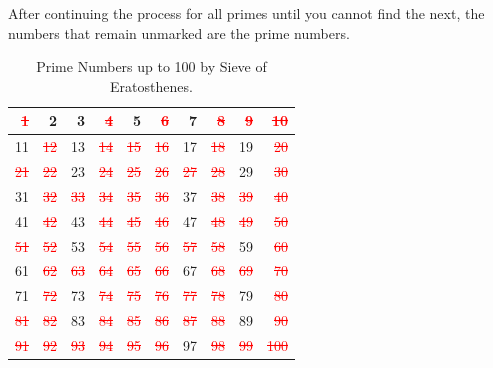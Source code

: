 \documentclass[12pt]{book}
\newcommand{\crossout}[1]{\textcolor{red}{\sout{#1}}}
\begin{document}
  After continuing the process for all primes until you cannot find the next, the numbers 
  that remain unmarked are the prime numbers.
  \begin{table}[h!]
    \centering
    \renewcommand{\arraystretch}{1.15}
    \label{tab:sieve_result}
  \begin{tabular}{|*{10}{r|}}
    \hline 
    \cellcolor{gray!25}\crossout{1} & 2 & 3 & \crossout{4} & 5 & \crossout{6} & 7 & \crossout{8} & \crossout{9} & \crossout{10} \\
    \hline 
    11 & \crossout{12} & 13 & \crossout{14} & \crossout{15} & \crossout{16} & 17 & \crossout{18} & 19 & \crossout{20} \\
    \hline 
    \crossout{21} & \crossout{22} & 23 & \crossout{24} & \crossout{25} & \crossout{26} & \crossout{27} & \crossout{28} & 29 & \crossout{30} \\
    \hline 
    31 & \crossout{32} & \crossout{33} & \crossout{34} & \crossout{35} & \crossout{36} & 37 & \crossout{38} & \crossout{39} & \crossout{40} \\
    \hline 
    41 & \crossout{42} & 43 & \crossout{44} & \crossout{45} & \crossout{46} & 47 & \crossout{48} & \crossout{49} & \crossout{50} \\
    \hline 
    \crossout{51} & \crossout{52} & 53 & \crossout{54} & \crossout{55} & \crossout{56} & \crossout{57} & \crossout{58} & 59 & \crossout{60} \\
    \hline 
    61 & \crossout{62} & \crossout{63} & \crossout{64} & \crossout{65} & \crossout{66} & 67 & \crossout{68} & \crossout{69} & \crossout{70} \\
    \hline 
    71 & \crossout{72} & 73 & \crossout{74} & \crossout{75} & \crossout{76} & \crossout{77} & \crossout{78} & 79 & \crossout{80} \\
    \hline 
    \crossout{81} & \crossout{82} & 83 & \crossout{84} & \crossout{85} & \crossout{86} & \crossout{87} & \crossout{88} & 89 & \crossout{90} \\
    \hline 
    \crossout{91} & \crossout{92} & \crossout{93} & \crossout{94} & \crossout{95} & \crossout{96} & 97 & \crossout{98} & \crossout{99} & \crossout{100} \\
    \hline 
  \end{tabular}
  \caption{Prime Numbers up to 100 by Sieve of Eratosthenes.}
  \end{table}
\end{document}
